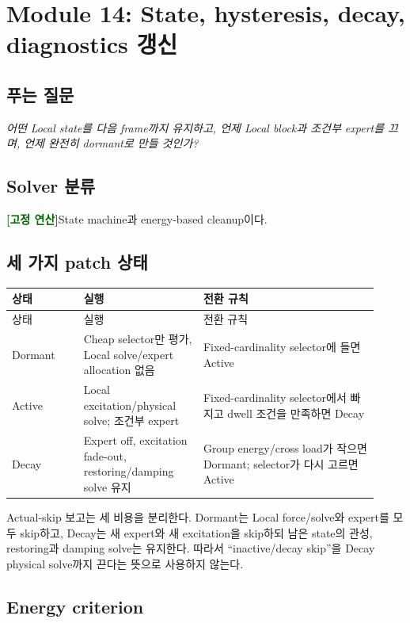 \documentclass[11pt,a4paper]{article}
\newcommand{\deterministic}{\textcolor{darkgreen}{\textbf{[고정 연산]}}}
\begin{document}
\section{Module 14: State, hysteresis, decay, diagnostics 갱신}

\subsection*{푸는 질문}

\emph{어떤 Local state를 다음 frame까지 유지하고,
언제 Local block과 조건부 expert를 끄며, 언제 완전히 dormant로 만들 것인가?}

\subsection*{Solver 분류}

\deterministic State machine과 energy-based cleanup이다.

\subsection*{세 가지 patch 상태}

\begin{longtable}{L{0.18\linewidth}L{0.30\linewidth}L{0.44\linewidth}}
\toprule
상태 & 실행 & 전환 규칙 \\
\midrule
\endfirsthead
\toprule
상태 & 실행 & 전환 규칙 \\
\midrule
\endhead
Dormant & Cheap selector만 평가, Local solve/expert allocation 없음 & Fixed-cardinality selector에 들면 Active \\
\addlinespace
Active & Local excitation/physical solve; 조건부 expert & Fixed-cardinality selector에서 빠지고 dwell 조건을 만족하면 Decay \\
\addlinespace
Decay & Expert off, excitation fade-out, restoring/damping solve 유지 & Group energy/cross load가 작으면 Dormant; selector가 다시 고르면 Active \\
\bottomrule
\end{longtable}

Actual-skip 보고는 세 비용을 분리한다. Dormant는 Local force/solve와 expert를 모두 skip하고,
Decay는 새 expert와 새 excitation을 skip하되 남은 state의 관성, restoring과 damping solve는 유지한다.
따라서 ``inactive/decay skip''을 Decay physical solve까지 끈다는 뜻으로 사용하지 않는다.

\subsection*{Energy criterion}
\end{document}
